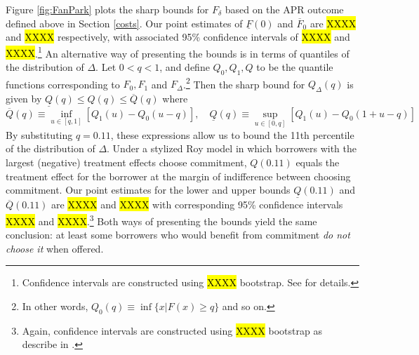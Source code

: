 \documentclass[oneside,11pt]{article}
\begin{document}
Figure \ref{fig:FanPark} plots the sharp bounds for $F_{\delta}$ based on the APR outcome defined above in Section \ref{costs}. Our point estimates of $\underline{F}(0)$ and $\overline{F}_0$ are \hl{XXXX} and \hl{XXXX} respectively, with associated 95\% confidence intervals of \hl{XXXX} and \hl{XXXX}.\footnote{Confidence intervals are constructed using \hl{XXXX} bootstrap. See \cite{fan2010sharp} for details.}
An alternative way of presenting the \cite{fan2010sharp} bounds is in terms of quantiles of the distribution of $\Delta$. Let $0 < q < 1$, and define $Q_0, Q_1, Q$ to be the quantile functions corresponding to $F_0, F_1$ and $F_\Delta$.\footnote{In other words, $Q_0(q) \equiv \inf \{x | F(x) \geq q\}$ and so on.} Then the sharp bound for $Q_\Delta(q)$ is given by $\underline{Q}(q) \leq Q(q) \leq \overline{Q}(q)$ where
\[
\overline{Q}(q) \equiv \inf_{u \in [q,1]} [Q_1(u) - Q_0(u - q)], \quad
\underline{Q}(q) \equiv \sup_{u\in [0,q]} [Q_1(u) - Q_0(1 + u - q)]
\]
By substituting $q = 0.11$, these expressions allow us to bound the 11th percentile of the distribution of $\Delta$. Under a stylized Roy model in which borrowers with the largest (negative) treatment effects choose commitment, $Q(0.11)$ equals the treatment effect for the borrower at the margin of indifference between choosing commitment. 
Our point estimates for the lower and upper bounds $\underline{Q}(0.11)$ and $\overline{Q}(0.11)$ are \hl{XXXX} and \hl{XXXX} with corresponding 95\% confidence intervals \hl{XXXX} and \hl{XXXX}.\footnote{Again, confidence intervals are constructed using \hl{XXXX} bootstrap as describe in \cite{fan2010sharp}.}
Both ways of presenting the bounds yield the same conclusion: at least some borrowers who would benefit from commitment \emph{do not choose it} when offered. 
\end{document}
